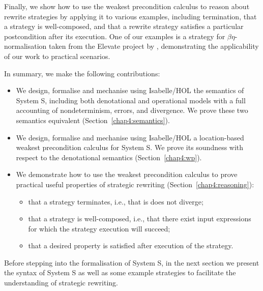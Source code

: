 Finally, we show how to use the weakest precondition calculus to reason about rewrite strategies by applying it to various examples, including termination, that a strategy is well-composed, and that a rewrite strategy satisfies a particular postcondition after its execution.
One of our examples is a strategy for $\beta\eta$-normalisation taken from the Elevate project by \citet{DBLP:journals/pacmpl/HagedornLKQGS20}, demonstrating the applicability of our work to practical scenarios.

In summary, we make the following contributions:
\begin{itemize}
  \setlength\itemsep{1.6ex}
    \item We design, formalise and mechanise using Isabelle/HOL the semantics of System S, including both denotational and operational models with a full accounting of nondeterminism, errors, and divergence. We prove these two semantics equivalent (Section~\ref{chap4:semantics}).
    \item We design, formalise and mechanise using Isabelle/HOL a location-based weakest precondition calculus for System S. We prove its soundness with respect to the denotational semantics (Section~\ref{chap4:wp}).
    \item We demonstrate how to use the weakest precondition calculus to prove practical useful properties of strategic rewriting (Section~\ref{chap4:reasoning}):
    \begin{itemize}
    \setlength\itemsep{0ex}
        \item that a strategy terminates, i.e., that is does not diverge;
        \item that a strategy is well-composed, i.e., that there exist input expressions for which the strategy execution will succeed;
        \item that a desired property is satisfied after execution of the strategy.
    \end{itemize}
\end{itemize}

Before stepping into the formalisation of System S, in the next section we present the syntax of System S as well as some example strategies to facilitate the understanding of strategic rewriting.

